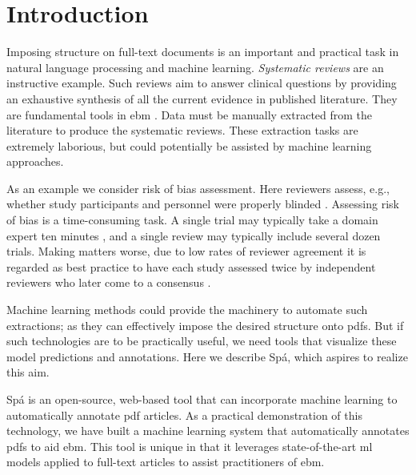 \documentclass[runningheads,a4paper]{llncs}
\begin{document}
\acresetall
{}

\section{Introduction}
\label{section:intro}

Imposing structure on full-text documents is an important and practical task in natural language processing and machine learning.
\emph{Systematic reviews} are an instructive example.
Such reviews aim to answer clinical questions by providing an exhaustive synthesis of all the current evidence in published literature.
They are fundamental tools in \ac{ebm} \cite{Sackett1996,Valkenhoef2012}.
Data must be manually extracted from the literature to produce the systematic reviews.
These extraction tasks are extremely laborious, but could potentially be assisted by machine learning approaches.

As an example we consider risk of bias assessment.
Here reviewers assess, e.g., whether study participants and personnel were properly blinded \cite{Higgins2011}.
Assessing risk of bias is a time-consuming task.
A single trial may typically take a domain expert ten minutes \cite{Hartling2011}, and a single review may typically include several dozen trials.
Making matters worse, due to low rates of reviewer agreement it is regarded as best practice to have each study assessed twice by independent reviewers who later come to a consensus \cite{Hartling2009}.

Machine learning methods could provide the machinery to automate such extractions; as they can effectively impose the desired structure onto \acp{pdf}.
But if such technologies are to be practically useful, we need tools that visualize these model predictions and annotations.
Here we describe Spá, which aspires to realize this aim.

Spá is an open-source, web-based tool that can incorporate machine learning to automatically annotate \ac{pdf} articles.
As a practical demonstration of this technology, we have built a machine learning system that automatically annotates \acp{pdf} to aid \ac{ebm}.
This tool is unique in that it leverages state-of-the-art \ac{ml} models applied to full-text articles to assist practitioners of \ac{ebm}.
\end{document}
